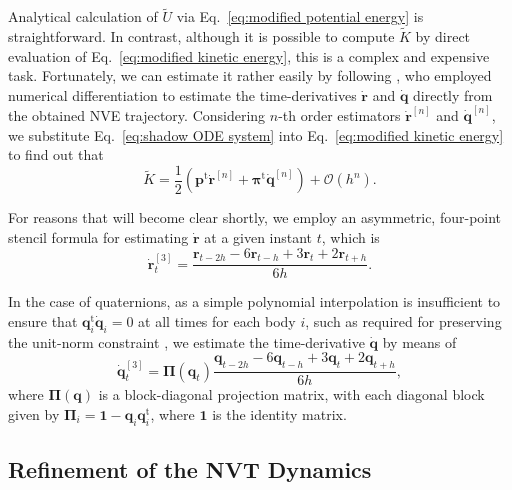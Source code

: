 \documentclass[
journal=jctcce,
layout=twocolumn
]{achemso}
\newcommand{\mt}[1]{\boldsymbol{\mathbf{#1}}}   %
\newcommand{\vt}[1]{\boldsymbol{\mathbf{#1}}}   %
\newcommand{\tr}[1]{#1^\text{t}}                %
\newcommand{\timestep}{h}
\newcommand{\refined}[1]{\widetilde{#1}}
\begin{document}
Analytical calculation of $\refined U$ via Eq.~\eqref{eq:modified potential energy} is straightforward.
In contrast, although it is possible to compute $\refined K$ by direct evaluation of Eq.~\eqref{eq:modified kinetic energy}, this is a complex and expensive task.
Fortunately, we can estimate it rather easily by following \citeauthor{Eastwood_2010} \cite{Eastwood_2010}, who employed numerical differentiation to estimate the time-derivatives $\dot{\vt r}$ and $\dot{\vt q}$ directly from the obtained NVE trajectory.
Considering $n$-th order estimators $\dot{\vt r}^{[n]}$ and $\dot{\vt q}^{[n]}$, we substitute Eq.~\eqref{eq:shadow ODE system} into Eq.~\eqref{eq:modified kinetic energy} to find out that
\begin{equation}
\label{eq:modified kinetic energy estimator}
\refined K = \frac{1}{2} \left( \tr{\vt p} \dot{\vt r}^{[n]} + \tr{\vt \pi} \dot{\vt q}^{[n]} \right) + \mathcal{O}(h^n).
\end{equation}

For reasons that will become clear shortly, we employ an asymmetric, four-point stencil formula for estimating $\dot{\vt r}$ at a given instant $t$, which is
\begin{equation*}
\dot{\vt r}^{[3]}_t = \frac{{\vt r}_{t-2\timestep} - 6 {\vt r}_{t-\timestep} + 3 {\vt r}_t + 2 {\vt r}_{t+\timestep}}{6\timestep}.
\end{equation*}

In the case of quaternions, as a simple polynomial interpolation is insufficient to ensure that $\tr{\vt q}_i \dot{\vt q}_i = 0$ at all times for each body $i$, such as required for preserving the unit-norm constraint \cite{Silveira_2017}, we estimate the time-derivative $\dot{\vt q}$ by means of \cite{Schay_1995}
\begin{equation*}
\dot{\vt q}^{[3]}_t = {\mt \Pi}({\vt q}_t) \frac{{\vt q}_{t-2\timestep} - 6 {\vt q}_{t-\timestep} + 3 {\vt q}_t + 2 {\vt q}_{t+\timestep}}{6\timestep},
\end{equation*}
where ${\mt \Pi}(\vt q)$ is a block-diagonal projection matrix, with each diagonal block given by ${\mt \Pi}_i = {\mt 1} - {\vt q}_i \tr{\vt q}_i$, where $\mt 1$ is the identity matrix.

\subsection{Refinement of the NVT Dynamics}
\label{sec:refined_method}
\end{document}
